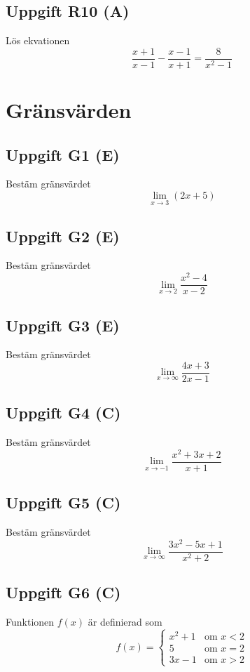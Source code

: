 \documentclass[12pt]{article}
\begin{document}
\subsection*{Uppgift R10 (A)}
Lös ekvationen
\[
\frac{x + 1}{x - 1} - \frac{x - 1}{x + 1} = \frac{8}{x^2 - 1}
\]

\newpage

\section{Gränsvärden}

\subsection*{Uppgift G1 (E)}
Bestäm gränsvärdet
\[
\lim_{x \to 3} (2x + 5)
\]

\subsection*{Uppgift G2 (E)}
Bestäm gränsvärdet
\[
\lim_{x \to 2} \frac{x^2 - 4}{x - 2}
\]

\subsection*{Uppgift G3 (E)}
Bestäm gränsvärdet
\[
\lim_{x \to \infty} \frac{4x + 3}{2x - 1}
\]

\subsection*{Uppgift G4 (C)}
Bestäm gränsvärdet
\[
\lim_{x \to -1} \frac{x^2 + 3x + 2}{x + 1}
\]

\subsection*{Uppgift G5 (C)}
Bestäm gränsvärdet
\[
\lim_{x \to \infty} \frac{3x^2 - 5x + 1}{x^2 + 2}
\]

\subsection*{Uppgift G6 (C)}
Funktionen $f(x)$ är definierad som
\[
f(x) = \begin{cases}
x^2 + 1 & \text{om } x < 2 \\
5 & \text{om } x = 2 \\
3x - 1 & \text{om } x > 2
\end{cases}
\]
\end{document}
